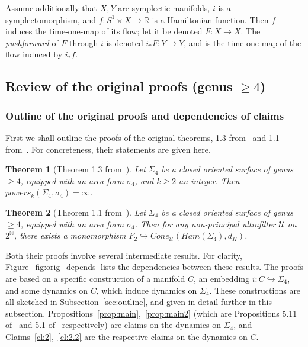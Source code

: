 \documentclass[11pt]{article}
\newtheorem{theorem}{Theorem}[section]
\newcommand{\R}{\mathbb{R}}
\newcommand{\N}{\mathbb{N}}
\begin{document}
        Assume additionally that $X,Y$ are symplectic manifolds, $i$ is a symplectomorphism, and $f: S^1 \times X \to \R$ is a Hamiltonian function. Then $f$ induces the time-one-map of its flow; let it be denoted $F: X \to X$. The \textit{pushforward} of $F$ through $i$ is denoted $i_* F: Y \to Y$, and is the time-one-map of the flow induced by $i_* f$.
        
    \subsection{Review of the original proofs (genus $\geq 4$)}
    \label{sec:3.1}
        \subsubsection{Outline of the original proofs and dependencies of claims}
            First we shall outline the proofs of the original theorems, 1.3 from~\cite{PS14} and 1.1 from~\cite{10}. For concreteness, their statements are given here.
            
            \begin{theorem}[Theorem 1.3 from~\cite{PS14}]
            \label{thm:orig2}
                Let $\Sigma_4$ be a closed oriented surface of genus $\geq 4$, equipped with an area form $\sigma_4$, and $k \geq 2$ an integer. Then $powers_k(\Sigma_4,\sigma_4) = \infty$.
            \end{theorem}
            
            \begin{theorem}[Theorem 1.1 from~\cite{10}]
            \label{thm:orig3}
                Let $\Sigma_4$ be a closed oriented surface of genus $\geq 4$, equipped with an area form $\sigma_4$. Then for any non-principal ultrafilter $\mathcal{U}$ on $2^\N$, there exists a monomorphism $F_2 \hookrightarrow Cone_\mathcal{U}(Ham(\Sigma_4),d_H)$.
            \end{theorem}
            
            Both their proofs involve several intermediate results. For clarity, Figure~\ref{fig:orig_depends} lists the dependencies between these results. The proofs are based on a specific construction of a manifold $C$, an embedding $i: C \hookrightarrow \Sigma_4$, and some dynamics on $C$, which induce dynamics on $\Sigma_4$. These constructions are all sketched in Subsection~\ref{sec:outline}, and given in detail further in this subsection. Propositions~\ref{prop:main},~\ref{prop:main2} (which are Propositions 5.11 of~\cite{10} and 5.1 of~\cite{PS14} respectively) are claims on the dynamics on $\Sigma_4$, and Claims~\ref{cl:2},~\ref{cl:2.2} are the respective claims on the dynamics on $C$.
            
\end{document}
